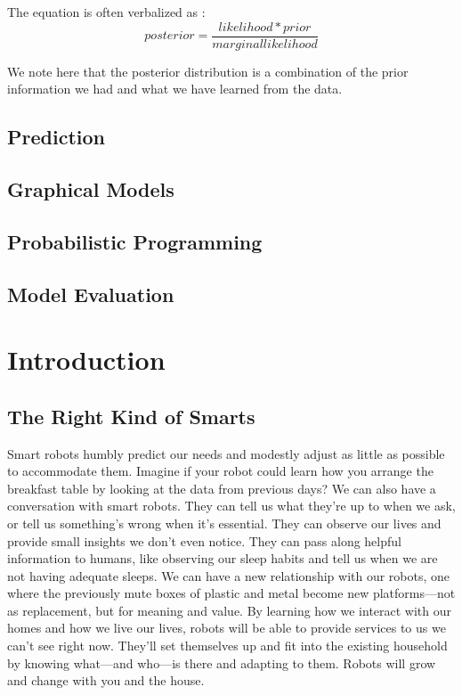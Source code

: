 \documentclass[11pt]{book}
\begin{document}
The equation is often verbalized as :
\begin{equation}
	posterior = \frac{likelihood * prior}{marginal likelihood}
\end{equation}

We note here that the posterior distribution is a combination of the prior information we had and what we have learned from the data. 




\section{Prediction}

\section{Graphical Models}

\section{Probabilistic Programming}

\section{Model Evaluation}
\chapter{Introduction}
\section{ The Right Kind of Smarts }
Smart robots humbly predict our needs and modestly adjust as little as possible to accommodate them. Imagine if your robot could learn how you arrange the breakfast table by looking at the data from previous days? 
We can also have a conversation with smart robots. They can tell us what they’re up to when we ask, or tell us something’s wrong when it’s essential. They can observe our lives and provide small insights we don’t even notice. They can pass along helpful information to humans, like observing our sleep habits and tell us when we are not having adequate sleeps.
We can have a new relationship with our robots, one where the previously mute boxes of plastic and metal become new platforms—not as replacement, but for meaning and value. By learning how we interact with our homes and how we live our lives, robots will be able to provide services to us we can’t see right now. They’ll set themselves up and fit into the existing household by knowing what—and who—is there and adapting to them. Robots will grow and change with you and the house.
\end{document}
